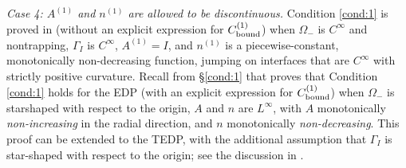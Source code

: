 \documentclass[10pt]{article}%
\numberwithin{equation}{section}
\newcommand{\beq}{\begin{equation}}
\newcommand{\eeq}{\end{equation}}
\newcommand{\ben}{\begin{enumerate}}
\newcommand{\een}{\end{enumerate}}
\newcommand{\cP}{{\cal P}}
\newcommand{\Oi}{{\Omega_-}}
\newcommand*{\N}[1]{\left\|#1\right\|}
\newcommand{\coeffAo}{A^{(1)}}
\newcommand{\coeffno}{n^{(1)}}
\begin{document}
\emph{Case 4: %
 $\coeffAo$ and $\coeffno$ are allowed to be discontinuous.}
Condition \ref{cond:1} is proved in \cite{CaVo:10} (without an explicit expression for $C^{(1)}_{\rm bound}$) when $\Oi$ is $C^\infty$ and nontrapping, $\Gamma_I$ is $C^\infty$, $\coeffAo= I $, and $\coeffno$ is a piecewise-constant, monotonically non-decreasing function, jumping on interfaces that are $C^\infty$ with strictly positive curvature.
Recall from \S\ref{cond:1} that \cite[Theorem 2.7]{GrPeSp:18} proves that Condition \ref{cond:1} holds for the EDP (with an explicit expression for $C^{(1)}_{\rm bound}$) when $\Oi$ is starshaped with respect to the origin, $A$ and $n$ are $L^\infty$, with $A$ monotonically \emph{non-increasing} in the radial direction, and $n$ monotonically \emph{non-decreasing}. This proof can be extended to the TEDP, with the additional assumption that $\Gamma_I$ is star-shaped with respect to the origin; see the discussion in \cite[Section A.2]{GrPeSp:18}.


%
%
%



\footnotesize{




}
\end{document}
